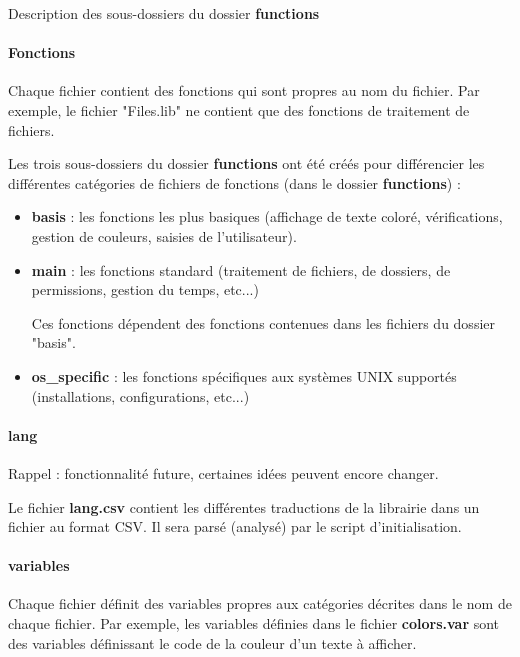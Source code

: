 \documentclass[a4paper,10pt]{article}
\begin{document}
Description des sous-dossiers du dossier \textbf{functions}
\setcounter{secnumdepth}{4}
\paragraph{Fonctions}
Chaque fichier contient des fonctions qui sont propres au nom du fichier. Par exemple, le fichier "Files.lib" ne contient que des fonctions de traitement de fichiers.

Les trois sous-dossiers du dossier \textbf{functions} ont été créés pour différencier les différentes catégories de fichiers de fonctions (dans le dossier \textbf{functions}) :
\begin{itemize}
    \item \color{lime}\textbf{basis}\color{white} : les fonctions les plus basiques (affichage de texte coloré, vérifications, gestion de couleurs, saisies de l'utilisateur).
    
    \item \color{lime}\textbf{main}\color{white} : les fonctions standard (traitement de fichiers, de dossiers, de permissions, gestion du temps, etc...)

    Ces fonctions dépendent des fonctions contenues dans les fichiers du dossier "basis".

    \item \color{lime}\textbf{os\_specific}\color{white} : les fonctions spécifiques aux systèmes UNIX supportés (installations, configurations, etc...)
\end{itemize}

\paragraph{lang}
Rappel : fonctionnalité future, certaines idées peuvent encore changer.

Le fichier \color{lime}\textbf{lang.csv}\color{white} contient les différentes traductions de la librairie dans un fichier au format CSV. Il sera parsé (analysé) par le script d'initialisation.

\paragraph{variables}
Chaque fichier définit des variables propres aux catégories décrites dans le nom de chaque fichier. Par exemple, les variables définies dans le fichier \color{lime}\textbf{colors.var}\color{white} sont des variables définissant le code de la couleur d'un texte à afficher.
\end{document}
